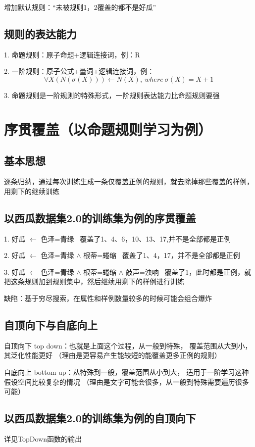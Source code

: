 \documentclass[UTF8]{article}
\begin{document}
    增加默认规则：“未被规则1，2覆盖的都不是好瓜”

\subsection{规则的表达能力}
    1. 命题规则：原子命题+逻辑连接词，例：R

    2. 一阶规则：原子公式+量词+逻辑连接词，例：
    \begin{equation}
        \forall X(N(\sigma (X)))\leftarrow N(X), ~where~ \sigma (X)=X+1
    \end{equation}
    
    3. 命题规则是一阶规则的特殊形式，一阶规则表达能力比命题规则要强

\section{序贯覆盖（以命题规则学习为例）}
\subsection{基本思想}
    逐条归纳，通过每次训练生成一条仅覆盖正例的规则，就去除掉那些覆盖的样例，用剩下的继续训练
\subsection{以西瓜数据集2.0的训练集为例的序贯覆盖}  
    1. 好瓜 $\leftarrow$ 色泽=青绿 
    ~覆盖了1、4、6，10、13、17,并不是全部都是正例  
    
    2. 好瓜 $\leftarrow$ 色泽=青绿 $\wedge$ 根蒂=蜷缩 
    ~覆盖了1、4，17，并不是全部都是正例  
    
    3. 好瓜 $\leftarrow$ 色泽=青绿 $\wedge$ 根蒂=蜷缩 $\wedge$ 敲声=浊响 
    ~覆盖了1，此时都是正例，就把这条规则加到规则集中，然后继续用剩下的样例进行训练
    
    缺陷：基于穷尽搜索，在属性和样例数量较多的时候可能会组合爆炸
\subsection{自顶向下与自底向上}
    自顶向下 top down：也就是上面这个过程，从一般到特殊，
    覆盖范围从大到小，其泛化性能更好
    （理由是更容易产生能较短的能覆盖更多正例的规则）
    
    自底向上 bottom up：从特殊到一般，覆盖范围从小到大，
    适用于一阶学习这种假设空间比较复杂的情况
    （理由是文字可能会很多，从一般到特殊需要遍历很多可能）
\subsection{以西瓜数据集2.0的训练集为例的自顶向下}
    详见TopDown函数的输出
\end{document}
